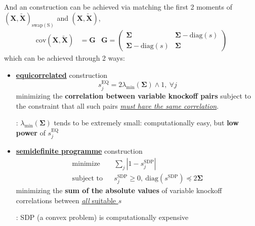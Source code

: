 \documentclass[twoside]{article}
\begin{document}
And an  construction can be achieved via matching the first 2 moments of $(\mathbf{X},\tilde{\mathbf{X}})_{\mathrm{swap(S)}}$ and $(\mathbf{X},\tilde{\mathbf{X}})$,
\begin{align*} \mathrm{cov}(\mathbf{X},\tilde{\mathbf{X}})&=\mathbf{G} & \mathbf{G}=
    \begin{pmatrix}
        \boldsymbol{\Sigma} & \boldsymbol{\Sigma}-\mathrm{diag}(s)\\
        \boldsymbol{\Sigma}-\mathrm{diag}(s) & \boldsymbol{\Sigma}
    \end{pmatrix}
\end{align*}
which can be achieved through 2 ways:
\begin{itemize}
    \item \textcolor{myblue}{\underline{\textbf{equicorrelated}}} construction
    $$
    s^{\mathrm{EQ}}_j = 2\lambda_{\min}(\boldsymbol{\Sigma})\wedge 1,\ \forall j
    $$
    minimizing the {\textbf{correlation between variable knockoff pairs}} subject to the constraint that all such pairs \underline{\textit{must have the same correlation}}.

    : $\lambda_{\min}(\boldsymbol{\Sigma})$ tends to be extremely small: computationally easy, but \textbf{low power} of $s_j^{\mathrm{EQ}}$
    \item \textcolor{myblue}{\underline{\textbf{semidefinite programme}}} construction
    \begin{align*}
        \text{minimize} & & \sum_j\left\vert 1-s_j^{\mathrm{SDP}} \right\vert \\
        \text{subject to} & & s_j^{\mathrm{SDP}}\geq 0, \ \mathrm{diag}\left(s^{\mathrm{SDP}}\right)\preceq 2\boldsymbol{\Sigma}
    \end{align*}
    minimizing the {\textbf{sum of the absolute values}} of variable knockoff correlations between \underline{\textit{all} suitable $s$}

    : SDP (a convex problem) is computationally expensive 
\end{itemize}
\end{document}
